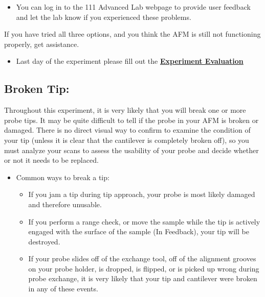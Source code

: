 \documentclass{../lab}
\begin{document}
{\begin{itemize}
\begin{itemize}
        \item You can log in to the 111 Advanced Lab webpage to provide user feedback and let the lab know if you experienced these problems.

    \end{itemize}

\end{itemize}

If you have tried all three options, and you think the AFM is still not functioning properly, get assistance.

\begin{itemize}
    \item Last day of the experiment please fill out the \href{\ExperimentEvaluation}{\textbf{Experiment Evaluation}}

\end{itemize}

\subsection{Broken Tip:}
\label{subsec:BrokenTip}

Throughout this experiment, it is very likely that you will break one or more probe tips.  It may be quite difficult to tell if the probe in your AFM is broken or damaged.  There is no direct visual way to confirm to examine the condition of your tip (unless it is clear that the cantilever is completely broken off), so you must analyze your scans to assess the usability of your probe and decide whether or not it needs to be replaced.

\begin{itemize}
    \item Common ways to break a tip:

    \begin{itemize}
        \item If you jam a tip during tip approach, your probe is most likely damaged and therefore unusable.

        \item If you perform a range check, or move the sample while the tip is actively engaged with the surface of the sample (In Feedback), your tip will be destroyed.

        \item If your probe slides off of the exchange tool, off of the alignment grooves on your probe holder, is dropped, is flipped, or is picked up wrong during probe exchange, it is very likely that your tip and cantilever were broken in any of these events.


\end{itemize}
\end{itemize}}
\end{document}
